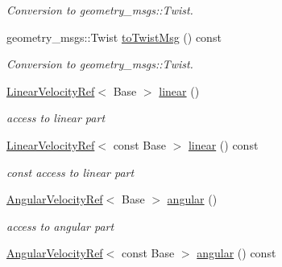 \begin{DoxyCompactItemize}
\begin{DoxyCompactList}\small\item\em Conversion to geometry\+\_\+msgs\+::\+Twist. \end{DoxyCompactList}\item 
geometry\+\_\+msgs\+::\+Twist \hyperlink{classow__core_1_1CartesianVelocity_a554aac9c93626cd576444a4fead7ac7f}{to\+Twist\+Msg} () const \hypertarget{classow__core_1_1CartesianVelocity_a554aac9c93626cd576444a4fead7ac7f}{}\label{classow__core_1_1CartesianVelocity_a554aac9c93626cd576444a4fead7ac7f}

\begin{DoxyCompactList}\small\item\em Conversion to geometry\+\_\+msgs\+::\+Twist. \end{DoxyCompactList}\item 
\hyperlink{classow__core_1_1LinearVelocityRef}{Linear\+Velocity\+Ref}$<$ Base $>$ \hyperlink{classow__core_1_1CartesianVelocity_acdd527df069a117b5395e0e667b5a267}{linear} ()\hypertarget{classow__core_1_1CartesianVelocity_acdd527df069a117b5395e0e667b5a267}{}\label{classow__core_1_1CartesianVelocity_acdd527df069a117b5395e0e667b5a267}

\begin{DoxyCompactList}\small\item\em access to linear part \end{DoxyCompactList}\item 
\hyperlink{classow__core_1_1LinearVelocityRef}{Linear\+Velocity\+Ref}$<$ const Base $>$ \hyperlink{classow__core_1_1CartesianVelocity_a06fd2a41cffc8c2b469254befd4d5e18}{linear} () const \hypertarget{classow__core_1_1CartesianVelocity_a06fd2a41cffc8c2b469254befd4d5e18}{}\label{classow__core_1_1CartesianVelocity_a06fd2a41cffc8c2b469254befd4d5e18}

\begin{DoxyCompactList}\small\item\em const access to linear part \end{DoxyCompactList}\item 
\hyperlink{classow__core_1_1AngularVelocityRef}{Angular\+Velocity\+Ref}$<$ Base $>$ \hyperlink{classow__core_1_1CartesianVelocity_adc8e89cb3eeb678bc74061c696bbd30d}{angular} ()\hypertarget{classow__core_1_1CartesianVelocity_adc8e89cb3eeb678bc74061c696bbd30d}{}\label{classow__core_1_1CartesianVelocity_adc8e89cb3eeb678bc74061c696bbd30d}

\begin{DoxyCompactList}\small\item\em access to angular part \end{DoxyCompactList}\item 
\hyperlink{classow__core_1_1AngularVelocityRef}{Angular\+Velocity\+Ref}$<$ const Base $>$ \hyperlink{classow__core_1_1CartesianVelocity_ab16fa37cdaada03fcb94ef0b2cd008aa}{angular} () const \hypertarget{classow__core_1_1CartesianVelocity_ab16fa37cdaada03fcb94ef0b2cd008aa}{}\label{classow__core_1_1CartesianVelocity_ab16fa37cdaada03fcb94ef0b2cd008aa}


\end{DoxyCompactItemize}
